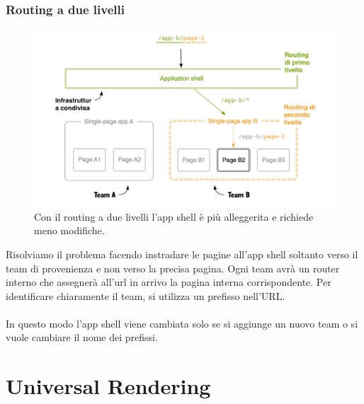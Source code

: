 \subsubsection{Routing a due livelli}
\begin{figure}[H]
    \centering
    \includegraphics[width=148mm]{img/routingduelivelli}
    \caption{Con il routing a due livelli l'app shell è più alleggerita e richiede meno modifiche.}
  \end{figure}

Risolviamo il problema facendo instradare le pagine all'app shell soltanto verso il team di provenienza 
e non verso la precisa pagina.
Ogni team avrà un router interno che assegnerà all'url in arrivo la pagina interna corrispondente.
Per identificare chiaramente il team, si utilizza un prefisso nell'URL.
\\\\
In questo modo l'app shell viene cambiata solo se si aggiunge un nuovo team o si vuole cambiare il nome dei prefissi.



\pagebreak
\section{Universal Rendering}

